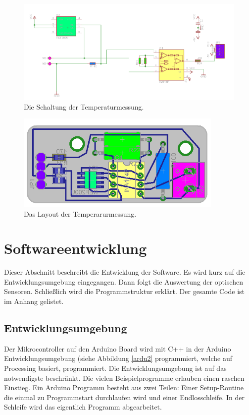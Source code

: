 \documentclass[a4paper,bibtotoc,oneside]{scrbook}
\begin{document}
\begin{figure}[htbp]
\centering
\includegraphics[width=125mm]{img/tmess.png}
\caption{Die Schaltung der Temperaturmessung.}\label{tmess}
\end{figure}

\begin{figure}[htbp]
\centering
\includegraphics[width=100mm]{img/tmess2.png}
\caption{Das Layout der Temperarurmessung.}\label{tmess2}
\end{figure}






\section{Softwareentwicklung}\thispagestyle{empty}
Dieser Abschnitt beschreibt die Entwicklung der Software. Es wird kurz auf die Entwicklungsumgebung eingegangen. Dann folgt die Auswertung der optischen Sensoren. Schließlich wird die Programmstruktur erklärt. Der gesamte Code ist im Anhang gelistet.

\subsection{Entwicklungsumgebung}\thispagestyle{empty}
Der Mikrocontroller auf den Arduino Board wird mit C++ in der Arduino Entwicklungsumgebung (siehe Abbildung \ref{ardu2} programmiert, welche auf Processing basiert, programmiert. Die Entwicklungsumgebung ist auf das notwendigste beschränkt. Die vielen Beispielprogramme erlauben einen raschen Einstieg.
Ein Arduino Programm besteht aus zwei Teilen: Einer Setup-Routine die einmal zu Programmstart durchlaufen wird und einer Endlosschleife. In der Schleife wird das eigentlich Programm abgearbeitet. 
\end{document}
